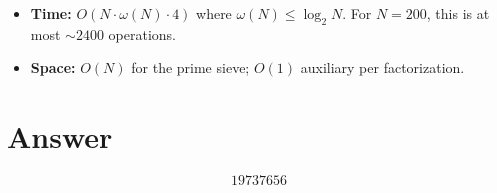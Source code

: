 \documentclass[12pt]{article}
\begin{document}
\begin{itemize}
    \item \textbf{Time:} $O(N \cdot \omega(N) \cdot 4)$ where $\omega(N) \leq \log_2 N$. For $N = 200$, this is at most $\sim 2400$ operations.
    \item \textbf{Space:} $O(N)$ for the prime sieve; $O(1)$ auxiliary per factorization.
\end{itemize}

\section{Answer}

\[
\boxed{19737656}
\]
\end{document}
